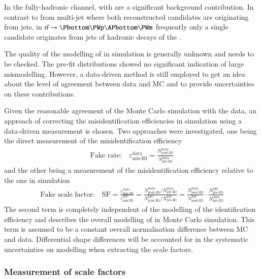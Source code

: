 In the fully-hadronic \hadhad channel, \ttbar with \faketauhad are a
significant background contribution. In contrast to \faketauhad from
multi-jet where both reconstructed \tauhad candidates are originating
from jets, in $\ttbar \ra \Pbottom \PWp \APbottom \PWm$ frequently
only a single \tauhadvis candidate originates from jets of hadronic
decays of the \PW.

The quality of the modelling of \faketauhad in simulation is generally
unknown and needs to be checked. The pre-fit distributions
showed no significant indication of large mismodelling. However, a
data-driven method is still employed to get an idea about the level of
agreement between data and MC and to provide uncertainties on these
contributions.

Given the reasonable agreement of the Monte Carlo simulation with the
data, an approach of correcting the misidentification efficiencies in
simulation using a data-driven measurement is chosen. Two approaches
were investigated, one being the direct measurement of the
misidentification efficiency
\begin{align*}
  \text{Fake rate:}\quad \varepsilon_\text{mis-ID}^\text{data} = \frac{N_\text{post-ID}^\text{data}}{N_\text{pre-ID}^\text{data}}
\end{align*}
and the other being a measurement of the misidentification efficiency
relative to the one in simulation
\begin{align*}
  \text{Fake scale factor:}\quad
  \text{SF} =
  \frac{\varepsilon_\text{mis-ID}^\text{data}}{\varepsilon_\text{mis-ID}^\text{MC}} =
  \frac{N_\text{post-ID}^\text{data} / N_\text{pre-ID}^\text{data}}{N_\text{post-ID}^\text{MC} / N_\text{pre-ID}^\text{MC}}
  = \frac{N_\text{post-ID}^\text{data}}{N_\text{post-ID}^\text{MC}} \cdot \frac{N_\text{pre-ID}^\text{MC}}{N_\text{pre-ID}^\text{data}}
\end{align*}
The second term is completely independent of the modelling of the
\tauhadvis identification efficiency and describes the overall
modelling of \ttbar in Monte Carlo simulation. This term is assumed to
be a constant overall normalisation difference between MC and
data. Differential shape differences will be accounted for in the
systematic uncertainties on \ttbar modelling when extracting the scale
factors.



\subsubsection{Measurement of scale factors}

